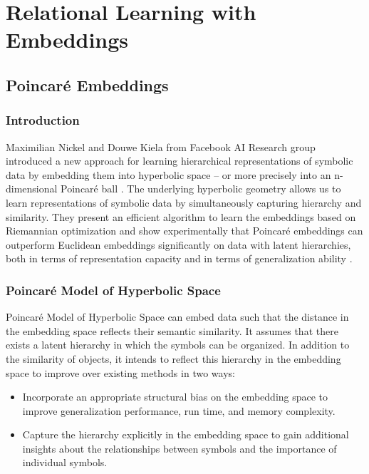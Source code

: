 
\chapter{Relational Learning with Embeddings}

\section{Poincaré Embeddings}


\subsection{Introduction}

Maximilian Nickel and Douwe Kiela from Facebook AI Research group introduced a new approach for learning hierarchical representations of symbolic data by embedding them into hyperbolic space – or more precisely into an n-dimensional Poincaré ball \cite{NIPS2017_7213}. The underlying hyperbolic geometry allows us to learn representations of symbolic data by simultaneously capturing hierarchy and similarity. They present an efficient algorithm to learn the embeddings based on Riemannian optimization and show experimentally that Poincaré embeddings can outperform Euclidean embeddings significantly on data with latent hierarchies, both in terms of representation capacity and in terms of generalization ability .

\subsection{Poincaré Model of Hyperbolic Space}

Poincaré Model of Hyperbolic Space can embed data such that the distance in the embedding space reflects their semantic similarity. It assumes that there exists a latent hierarchy in which the symbols can be organized. In addition to the similarity of objects, it intends to reflect this hierarchy in the embedding space to improve over existing methods in two ways:
\begin{itemize}
    \item Incorporate an appropriate structural bias on the embedding space to improve generalization performance, run time, and memory complexity.
    \item Capture the hierarchy explicitly in the embedding space to gain additional insights about the relationships between symbols and the importance of individual symbols.
\end{itemize}

